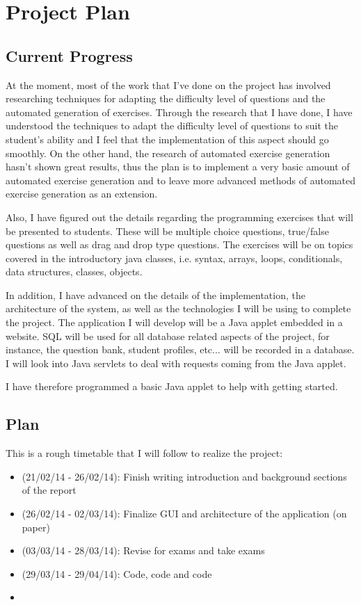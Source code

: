 \documentclass[11pt,a4paper]{report}
\begin{document}

\chapter{Project Plan}
\section{Current Progress}
At the moment, most of the work that I've done on the project has involved researching techniques for adapting the difficulty level of questions and the automated generation of exercises. Through the research that I have done, I have understood the techniques to adapt the difficulty level of questions to suit the student's ability and I feel that the implementation of this aspect should go smoothly. On the other hand, the research of automated exercise generation hasn't shown great results, thus the plan is to implement a very basic amount of automated exercise generation and to leave more advanced methods of automated exercise generation as an extension. \newline

Also, I have figured out the details regarding the programming exercises that will be presented to students. These will be multiple choice questions, true/false questions as well as drag and drop type questions. The exercises will be on topics covered in the introductory java classes, i.e. syntax, arrays, loops, conditionals, data structures, classes, objects.
\newline

In addition, I have advanced on the details of the implementation, the architecture of the system, as well as the technologies I will be using to complete the project. The application I will develop will be a Java applet embedded in a website. SQL will be used for all database related aspects of the project, for instance, the question bank, student profiles, etc... will be recorded in a database. I will look into Java servlets to deal with requests coming from the Java applet. \newline

I have therefore programmed a basic Java applet to help with getting started.

\section{Plan}
This is a rough timetable that I will follow to realize the project:
\begin{itemize}
\item (21/02/14 - 26/02/14): Finish writing introduction and background sections of the report
\item (26/02/14 - 02/03/14): Finalize GUI and architecture of the application (on paper)
\item (03/03/14 - 28/03/14): Revise for exams and take exams
\item (29/03/14 - 29/04/14): Code, code and code
\item 
\end{itemize}
\end{document}
